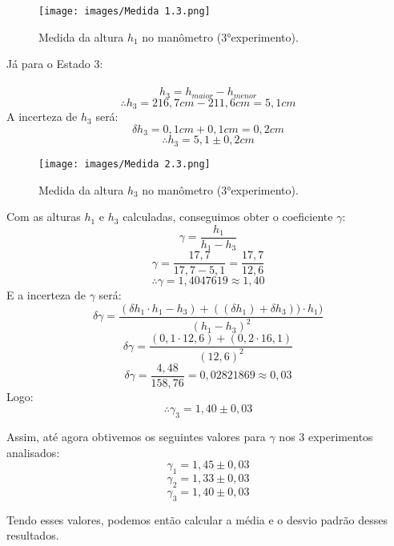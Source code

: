 \begin{figure}[H]
  \centering
  \texttt{[image: images/Medida 1.3.png]}
  \caption{Medida da altura $h_1$ no manômetro (3°experimento).}
\end{figure}

Já para o Estado 3:\\

\ \[h_3 = h_{maior} - h_{menor} \]
\[\therefore h_3 = 216,7 cm - 211,6 cm  = 5,1 cm\]
A incerteza de $h_3$ será:\\
\[\delta h_3 = 0,1 cm + 0,1 cm =  0,2 cm\]
\[\therefore h_3 = 5,1 \pm 0,2 cm\]


\begin{figure}[H]
  \centering
  \texttt{[image: images/Medida 2.3.png]}
  \caption{Medida da altura $h_3$ no manômetro (3°experimento).}
\end{figure}

Com as alturas $h_1$ e $h_3$ calculadas, conseguimos obter o coeficiente $\gamma$:\\

\[ \gamma = \frac{h_1}{h_1 - h_3}\]
\[ \gamma = \frac{17,7}{17,7 - 5,1} = \frac{17,7}{12,6} \]
\[\therefore \gamma = 1,4047619 \approx 1,40 \]
E a incerteza de $\gamma$ será:\\
\[\delta \gamma = \frac{(\delta h_1 \cdot h_1 - h_3)+((\delta h_1) + \delta h_3)) \cdot h_1)}{(h_1 - h_3)^2}\]
\[\delta \gamma = \frac{(0,1 \cdot 12,6)+(0,2 \cdot 16,1)}{(12,6)^2}\]
\[\delta \gamma = \frac{4,48}{158,76} = 0,02821869 \approx 0,03\]
Logo:\\ 
\[\therefore \gamma_3 = 1,40 \pm 0,03 \]

Assim, até agora obtivemos os seguintes valores para $\gamma$ nos 3 experimentos analisados:\\
\[\gamma_1 = 1,45 \pm 0,03\]
\[\gamma_2 = 1,33 \pm 0,03\]
\[\gamma_3 = 1,40 \pm 0,03\]

Tendo esses valores, podemos então calcular a média e o desvio padrão desses resultados.\\